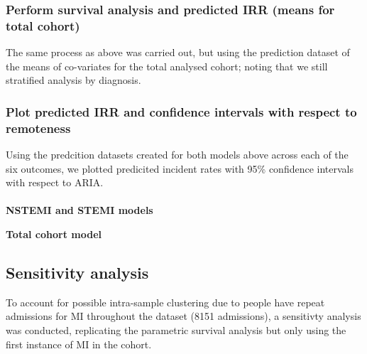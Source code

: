 \documentclass[11pt]{article}
\begin{document}
\subsubsection{Perform survival analysis and predicted IRR (means for total cohort)}
The same process as above was carried out, but using the prediction dataset of the means of co-variates for the total analysed cohort; noting that we still stratified analysis by diagnosis.
\color{violet}
\begin{stlog}\end{stlog}
\color{black}
\subsubsection{Plot predicted IRR and confidence intervals with respect to remoteness}
Using the predcition datasets created for both models above across each of the six outcomes, we plotted predicited incident rates with 95\% confidence intervals with respect to ARIA. \\~\\
\textbf{NSTEMI and STEMI models}
\color{violet}
\begin{stlog}\end{stlog}
\color{black}
\textbf{Total cohort model}
\color{violet}
\begin{stlog}\end{stlog}
\color{black}
\subsection{Sensitivity analysis}
To account for possible intra-sample clustering due to people have repeat admissions for MI throughout the dataset (8151 admissions), a sensitivty analysis was conducted, replicating the parametric survival analysis but only using the first instance of MI in the cohort. 
\color{violet}
\begin{stlog}\end{stlog}
\color{black}
\end{document}
